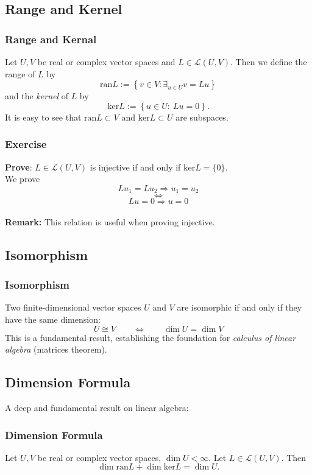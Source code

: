 \documentclass[12pt, t]{beamer}
\renewcommand{\emph}[1]{{\color{Turquoise3}\textsl{#1}}}
\newcommand{\nullspace}{~\\[15pt]}
\newcommand{\remark}{\textbf{Remark: }}
\begin{document}
\subsection{Range and Kernel}
\begin{frame}
    \frametitle{\textbf{Range and Kernal}}
    Let $U,V$ be real or complex vector spaces and $L\in\mathcal{L}(U,V)$. Then we define the range of $L$ by
    \[\text{ran}L:=\left\{v\in V:\mathop{\exists}_{u\in U}v=Lu\right\}\]
    and the \emph{kernel} of $L$ by
    \[\text{ker}L:=\left\{u\in U:~Lu=0\right\}.\]
    It is easy to see that $\text{ran}L\subset V$ and $\text{ker}L\subset U$ are subspaces.
\end{frame}

\begin{frame}
    \frametitle{Exercise}
    \textbf{Prove}:
    $L\in\mathcal{L}(U,V)$ is injective if and only if $\text{ker}L=\{0\}$.
    \nullspace
    \pause
    We prove
    $$
        Lu_1=Lu_2\Rightarrow u_1=u_2
    $$
    $$
        \Leftrightarrow
    $$
    $$
        Lu=0\Rightarrow u=0
    $$
    \nullspace
    \remark This relation is useful when proving injective.
\end{frame}

\subsection{Isomorphism}
\begin{frame}
    \frametitle{Isomorphism}
    Two finite-dimensional vector spaces $U$ and $V$ are isomorphic if and only if they have the same dimension:
    \[U\cong V\qquad\Leftrightarrow\qquad\dim U=\dim V\]
    This is a fundamental result, establishing the foundation for \emph{calculus of linear algebra} (matrices theorem).

\end{frame}

\subsection{Dimension Formula}
\begin{frame}
    A deep and fundamental result on linear algebra:\nullspace
    \frametitle{Dimension Formula}
    Let $U,V$ be real or complex vector spaces, $\dim U<\infty$. Let $L\in\mathcal{L}(U,V)$. Then
    \begin{equation}
        \dim\text{ran}L+\dim\text{ker}L=\dim U.
    \end{equation}
\end{frame}
\end{document}
